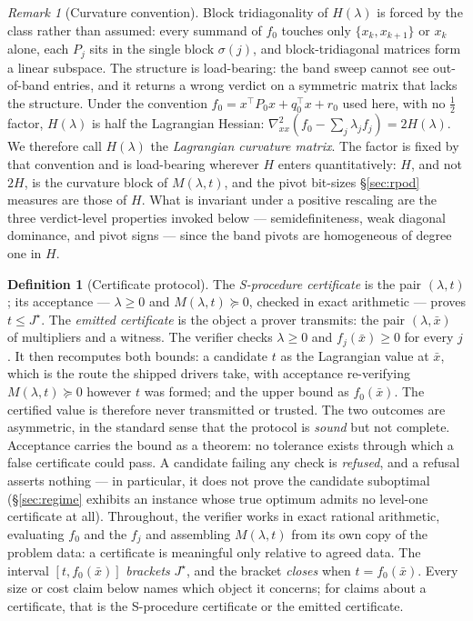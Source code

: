 \documentclass[11pt]{article}
\theoremstyle{definition}
\newtheorem{definition}{Definition}
\theoremstyle{remark}
\newtheorem{remark}{Remark}
\renewcommand{\_}{\ifdim\fontdimen3\font=0pt\relax\char`\_\else\textunderscore\fi\hspace{0pt}}
\begin{document}
\begin{remark}[Curvature convention]\label{rem:curvature}
Block tridiagonality of $H(\lambda)$ is forced by the class rather than
assumed: every summand of $f_0$ touches only $\{x_k,x_{k+1}\}$ or $x_k$ alone,
each $P_j$ sits in the single block $\sigma(j)$, and block-tridiagonal
matrices form a linear subspace. The structure is load-bearing: the band sweep
cannot see out-of-band entries, and it returns a wrong verdict on a symmetric
matrix that lacks the structure. Under the convention
$f_0=x^\top P_0x+q_0^\top x+r_0$ used here, with no $\tfrac12$ factor,
$H(\lambda)$ is half the Lagrangian Hessian:
$\nabla^2_{xx}(f_0-\sum_j\lambda_jf_j)=2H(\lambda)$. We therefore call
$H(\lambda)$ the \emph{Lagrangian curvature matrix}.
The factor is fixed by that convention
and is load-bearing wherever $H$ enters quantitatively: $H$, and not $2H$, is
the curvature block of $M(\lambda,t)$, and the pivot bit-sizes
\S\ref{sec:rpod} measures are those of $H$. What is invariant under a positive
rescaling are the three verdict-level properties invoked below ---
semidefiniteness, weak diagonal dominance, and pivot signs --- since the band
pivots are homogeneous of degree one in $H$.
\end{remark}

\begin{definition}[Certificate protocol]\label{def:protocol}
The \emph{S-procedure certificate} is the pair $(\lambda,t)$; its acceptance
--- $\lambda\ge0$ and $M(\lambda,t)\succeq0$, checked in exact arithmetic ---
proves $t\le J^\star$. The \emph{emitted certificate} is the object a prover
transmits: the pair $(\lambda,\bar x)$ of multipliers and a witness. The
verifier checks $\lambda\ge0$ and $f_j(\bar x)\ge0$ for every $j$.
It then recomputes both bounds: a candidate $t$ as the Lagrangian
value at $\bar x$, which is the route the shipped drivers take, with
acceptance re-verifying $M(\lambda,t)\succeq0$ however $t$ was formed; and the
upper bound as $f_0(\bar x)$. The certified value is therefore never
transmitted or trusted.
The two outcomes are asymmetric, in the standard sense that the protocol is
\emph{sound} but not complete. Acceptance carries the bound as a theorem: no
tolerance exists through which a false certificate could pass. A candidate
failing any check is \emph{refused}, and a refusal asserts nothing --- in
particular, it does not prove the candidate suboptimal (\S\ref{sec:regime}
exhibits an instance whose true optimum admits no level-one certificate at
all).
Throughout, the verifier works in exact rational arithmetic, evaluating $f_0$
and the $f_j$ and assembling $M(\lambda,t)$ from its own copy of the problem
data: a certificate is meaningful only relative to agreed data. The interval $[t,f_0(\bar x)]$
\emph{brackets} $J^\star$, and the bracket \emph{closes} when $t=f_0(\bar x)$.
Every size or cost claim below names which object it concerns; for claims
about a certificate, that is the S-procedure certificate or the emitted
certificate.
\end{definition}
\end{document}
